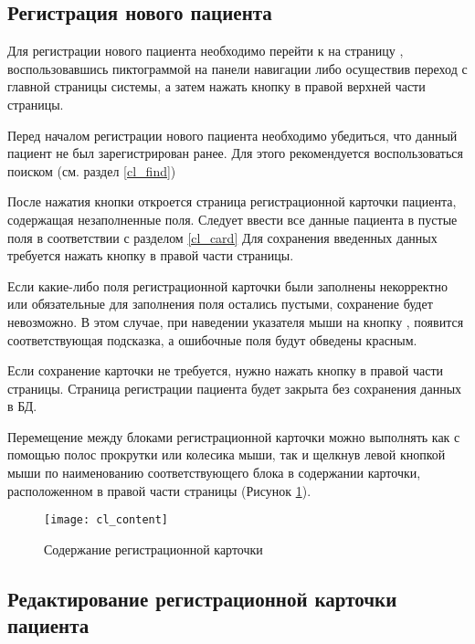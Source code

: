 {\subsection{Регистрация нового пациента} \label{cl_new}

Для регистрации нового пациента необходимо перейти к на страницу , воспользовавшись пиктограммой на панели навигации либо осуществив переход с главной страницы системы, а затем нажать кнопку   в правой верхней части страницы.

\begin{vnim}
Перед началом регистрации нового пациента необходимо убедиться, что данный пациент не был зарегистрирован ранее. Для этого рекомендуется воспользоваться поиском (см. раздел \ref{cl_find})
\end{vnim}

После нажатия кнопки  откроется страница регистрационной карточки пациента,  содержащая незаполненные поля. Следует ввести все данные пациента в пустые поля в соответствии с разделом \ref{cl_card} Для сохранения введенных данных требуется нажать кнопку  в правой части страницы.

Если какие-либо поля регистрационной карточки были заполнены некорректно или обязательные для заполнения поля остались пустыми, сохранение будет невозможно. В этом случае, при наведении указателя мыши на кнопку , появится соответствующая подсказка, а ошибочные поля будут обведены красным.

Если сохранение карточки не требуется, нужно нажать кнопку  в правой части страницы. Страница регистрации пациента будет закрыта без сохранения данных в БД.

Перемещение между блоками регистрационной карточки можно выполнять как с помощью полос прокрутки или колесика мыши, так и щелкнув левой кнопкой мыши по наименованию соответствующего блока в содержании карточки, расположенном в правой части страницы (Рисунок \ref{img_cl_content}). 

\begin{figure}[ht]\centering
 \texttt{[image: cl\_content]}
 \caption{Содержание регистрационной карточки}
 \label{img_cl_content}
\end{figure} 

\subsection{Редактирование регистрационной карточки пациента}

}
